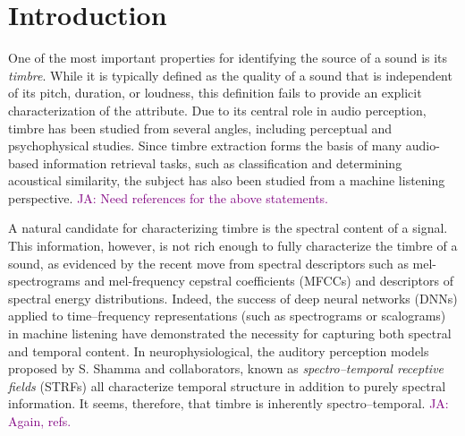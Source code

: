 \documentclass{bmcart}
\newcommand{\ja}[1]{\textcolor{purple}{JA: #1}}
\begin{document}
\section*{Introduction}
\label{sec:intro}


One of the most important properties for identifying the source of a sound is its \emph{timbre}.
While it is typically defined as the quality of a sound that is independent of its pitch, duration, or loudness, this definition fails to provide an explicit characterization of the attribute.
Due to its central role in audio perception, timbre has been studied from several angles, including perceptual and psychophysical studies.
Since timbre extraction forms the basis of many audio-based information retrieval tasks, such as classification and determining acoustical similarity, the subject has also been studied from a machine listening perspective.
\ja{Need references for the above statements.}

A natural candidate for characterizing timbre is the spectral content of a signal.
This information, however, is not rich enough to fully characterize the timbre of a sound, as evidenced by the recent move from spectral descriptors such as mel-spectrograms and mel-frequency cepstral coefficients (MFCCs) and descriptors of spectral energy distributions.
Indeed, the success of deep neural networks (DNNs) applied to time--frequency representations (such as spectrograms or scalograms) in machine listening have demonstrated the necessity for capturing both spectral and temporal content.
In neurophysiological, the auditory perception models proposed by S. Shamma and collaborators, known as \emph{spectro--temporal receptive fields} (STRFs) all characterize temporal structure in addition to purely spectral information.
It seems, therefore, that timbre is inherently spectro--temporal.
\ja{Again, refs.}
\end{document}
